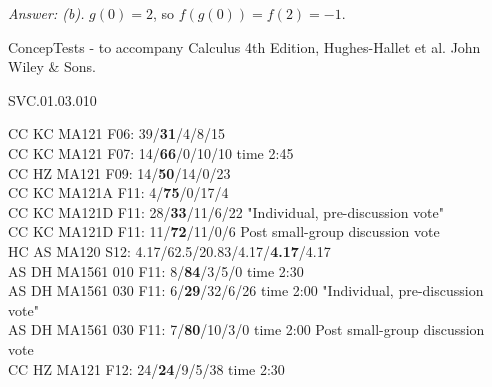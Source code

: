 {\it Answer: (b).} $g(0) = 2$, so $f(g(0)) = f(2) = -1$.

\medskip


\medskip
ConcepTests - to accompany Calculus 4th Edition, Hughes-Hallet et al. John Wiley \& Sons.

SVC.01.03.010


CC KC MA121 F06: 39/{\bf 31}/4/8/15 \\
CC KC MA121 F07: 14/{\bf66}/0/10/10 time 2:45\\
CC HZ MA121 F09: 14/{\bf50}/14/0/23  \\
CC KC MA121A F11: 4/{\bf75}/0/17/4  \\
CC KC MA121D F11: 28/{\bf33}/11/6/22 "Individual, pre-discussion vote" \\
CC KC MA121D F11: 11/{\bf72}/11/0/6 Post small-group discussion vote \\
HC AS MA120 S12: 4.17/62.5/20.83/4.17/{\bf4.17}/4.17  \\
AS DH MA1561 010 F11: 8/{\bf84}/3/5/0 time 2:30  \\
AS DH MA1561 030 F11: 6/{\bf29}/32/6/26 time 2:00 "Individual, pre-discussion vote" \\
AS DH MA1561 030 F11: 7/{\bf80}/10/3/0 time 2:00 Post small-group discussion vote \\
CC HZ MA121 F12: 24/{\bf24}/9/5/38 time 2:30  \\
